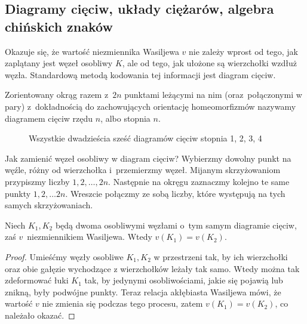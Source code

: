 
\subsection{Diagramy cięciw, układy ciężarów, algebra chińskich znaków}

Okazuje się, że wartość niezmiennika Wasiljewa $v$ nie zależy wprost od tego, jak zaplątany jest węzeł osobliwy $K$, ale od tego, jak ułożone są wierzchołki wzdłuż węzła.
Standardową metodą kodowania tej informacji jest diagram cięciw.

\begin{definition}
%
    Zorientowany okrąg razem z~$2n$ punktami leżącymi na nim (oraz~połączonymi w pary) z~dokładnością do zachowujących orientację homeomorfizmów nazywamy diagramem cięciw rzędu $n$, albo stopnia $n$.
\end{definition}

\begin{figure}[H]
    \centering
\begin{comment}

\end{comment}
    \caption{Wszystkie dwadzieścia sześć diagramów cięciw stopnia 1, 2, 3, 4}
\end{figure}

Jak zamienić węzeł osobliwy w diagram cięciw?
Wybierzmy dowolny punkt na węźle, różny od wierzchołka i~przemierzmy węzeł.
Mijanym skrzyżowaniom przypiszmy liczby $1, 2, \ldots, 2n$.
Następnie na okręgu zaznaczmy kolejno te same punkty $1, 2, \ldots 2n$.
Wreszcie połączmy ze sobą liczby, które występują na tych samych skrzyżowaniach.


\begin{proposition}
    Niech $K_1, K_2$ będą dwoma osobliwymi węzłami o~tym samym diagramie cięciw, zaś $v$~niezmiennikiem Wasiljewa.
    Wtedy $v(K_1) = v(K_2)$.
\end{proposition}

\begin{proof}
    Umieśćmy węzły osobliwe $K_1, K_2$ w przestrzeni tak, by ich wierzchołki oraz obie gałęzie wychodzące z wierzchołków leżały tak samo. Wtedy można tak zdeformować łuki $K_1$ tak, by jedynymi osobliwościami, jakie się pojawią lub znikną, były podwójne punkty.
    Teraz relacja akłębiasta Wasiljewa mówi, że wartość $v$ nie zmienia się podczas tego procesu, zatem $v(K_1) = v(K_2)$, co należało okazać.
\end{proof}

